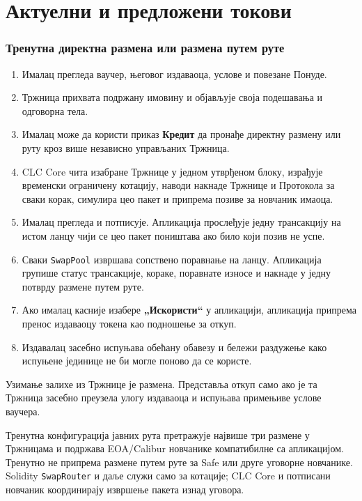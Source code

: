 \documentclass[11pt]{article}
\begin{document}
\section*{Актуелни и предложени токови}

\subsubsection*{Тренутна директна размена или размена путем руте}

\begin{enumerate}[leftmargin=*]
\item Ималац прегледа ваучер, његовог издаваоца, услове и повезане Понуде.
\item Тржница прихвата подржану имовину и објављује своја подешавања и одговорна тела.
\item Ималац може да користи приказ \textbf{Кредит} да пронађе директну размену или руту кроз више независно управљаних Тржница.
\item CLC Core чита изабране Тржнице у једном утврђеном блоку, израђује временски ограничену котацију, наводи накнаде Тржнице и Протокола за сваки корак, симулира цео пакет и припрема позиве за новчаник имаоца.
\item Ималац прегледа и потписује. Апликација прослеђује једну трансакцију на истом ланцу чији се цео пакет поништава ако било који позив не успе.
\item Сваки \texttt{SwapPool} извршава сопствено поравнање на ланцу. Апликација групише статус трансакције, кораке, поравнате износе и накнаде у једну потврду размене путем руте.
\item Ако ималац касније изабере \textbf{„Искористи``} у апликацији, апликација припрема пренос издаваоцу токена као подношење за откуп.
\item Издавалац засебно испуњава обећану обавезу и бележи раздужење како испуњене јединице не би могле поново да се користе.
\end{enumerate}
Узимање залихе из Тржнице је размена. Представља откуп само ако је та Тржница засебно преузела улогу издаваоца и испуњава примењиве услове ваучера.

Тренутна конфигурација јавних рута претражује највише три размене у Тржницама и подржава EOA/Calibur новчанике компатибилне са апликацијом. Тренутно не припрема размене путем руте за Safe или друге уговорне новчанике. Solidity \texttt{SwapRouter} и даље служи само за котације; CLC Core и потписани новчаник координирају извршење пакета изнад уговора.
\end{document}

